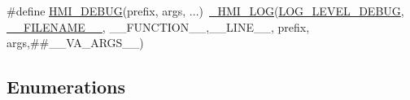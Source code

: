 \begin{DoxyCompactItemize}
\item 
\#define \hyperlink{src_2hmi-debug_8h_a0d26d8b8201011dade787236519711c0}{H\+M\+I\+\_\+\+D\+E\+B\+UG}(prefix,  args, ...)~\hyperlink{src_2hmi-debug_8h_a0846b9d51e2e0612c4825a9a581aa40a}{\+\_\+\+H\+M\+I\+\_\+\+L\+OG}(\hyperlink{src_2hmi-debug_8h_aa5a9053636a30269210c54e734e0d583a538b2b6e011479d408ecd2be0f6d6177}{L\+O\+G\+\_\+\+L\+E\+V\+E\+L\+\_\+\+D\+E\+B\+UG}, \hyperlink{src_2hmi-debug_8h_a5fccb4fc71e44089a1b1a77fc76c0b68}{\+\_\+\+\_\+\+F\+I\+L\+E\+N\+A\+M\+E\+\_\+\+\_\+}, \+\_\+\+\_\+\+F\+U\+N\+C\+T\+I\+O\+N\+\_\+\+\_\+,\+\_\+\+\_\+\+L\+I\+N\+E\+\_\+\+\_\+, prefix, args,\#\#\+\_\+\+\_\+\+V\+A\+\_\+\+A\+R\+G\+S\+\_\+\+\_\+)
\end{DoxyCompactItemize}
\subsection*{Enumerations}
